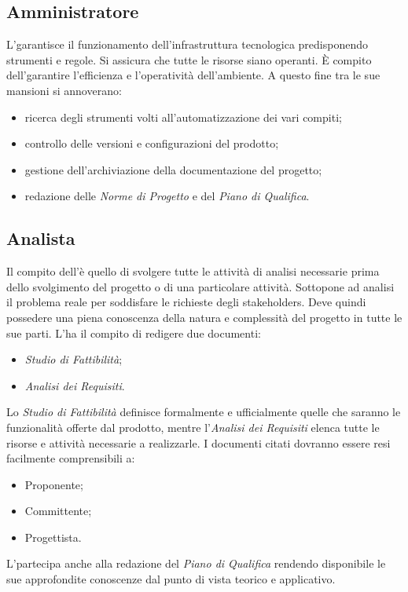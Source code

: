 \subsection{Amministratore}
L'\Amministratore\space garantisce il funzionamento dell'infrastruttura tecnologica predisponendo strumenti e regole. Si assicura che tutte le risorse siano operanti. È compito dell'\Amministratore\space garantire l'efficienza e l'operatività dell'ambiente. A questo fine tra le sue mansioni si annoverano:
\begin{itemize}
	\item ricerca degli strumenti volti all'automatizzazione dei vari compiti;
	\item controllo delle versioni e configurazioni del prodotto;
	\item gestione dell'archiviazione della documentazione del progetto;
	\item redazione delle \textit{Norme di Progetto} e del \textit{Piano di Qualifica}.
\end{itemize}

\subsection{Analista}
Il compito dell'\Analista\space è quello di svolgere tutte le attività di analisi necessarie prima dello svolgimento del progetto o di una particolare attività. Sottopone ad analisi il problema reale per soddisfare le richieste degli stakeholders. Deve quindi possedere una piena conoscenza della natura e complessità del progetto in tutte le sue parti. L'\Analista\space ha il compito di redigere due documenti:
\begin{itemize}
	\item \textit{Studio di Fattibilità};
	\item \textit{Analisi dei Requisiti}.
\end{itemize}
Lo \textit{Studio di Fattibilità} definisce formalmente e ufficialmente quelle che saranno le funzionalità offerte dal prodotto, mentre l'\textit{Analisi dei Requisiti} elenca tutte le risorse e attività necessarie a realizzarle. I documenti citati dovranno essere resi facilmente comprensibili a:
\begin{itemize}
	\item Proponente;
	\item Committente;
	\item Progettista.
\end{itemize}
L'\Analista\space partecipa anche alla redazione del \textit{Piano di Qualifica} rendendo disponibile le sue approfondite conoscenze dal punto di vista teorico e applicativo.

